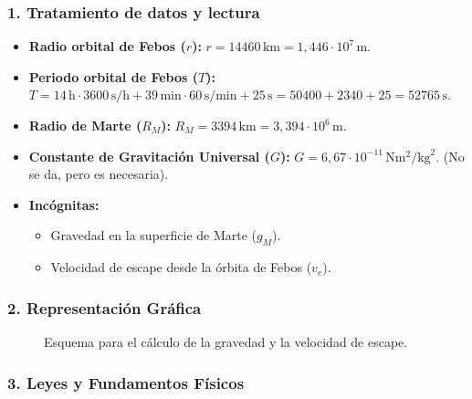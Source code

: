 \subsubsection*{1. Tratamiento de datos y lectura}
\begin{itemize}
    \item \textbf{Radio orbital de Febos ($r$):} $r = 14460\,\text{km} = 1,446 \cdot 10^7\,\text{m}$.
    \item \textbf{Periodo orbital de Febos ($T$):} $T = 14\,\text{h} \cdot 3600\,\text{s/h} + 39\,\text{min} \cdot 60\,\text{s/min} + 25\,\text{s} = 50400 + 2340 + 25 = 52765\,\text{s}$.
    \item \textbf{Radio de Marte ($R_M$):} $R_M = 3394\,\text{km} = 3,394 \cdot 10^6\,\text{m}$.
    \item \textbf{Constante de Gravitación Universal ($G$):} $G = 6,67 \cdot 10^{-11}\,\text{N}\text{m}^2/\text{kg}^2$. (No se da, pero es necesaria).
    \item \textbf{Incógnitas:}
    \begin{itemize}
        \item Gravedad en la superficie de Marte ($g_M$).
        \item Velocidad de escape desde la órbita de Febos ($v_e$).
    \end{itemize}
\end{itemize}

\subsubsection*{2. Representación Gráfica}
\begin{figure}[H]
    \centering
    \caption{Esquema para el cálculo de la gravedad y la velocidad de escape.}
\end{figure}

\subsubsection*{3. Leyes y Fundamentos Físicos}
